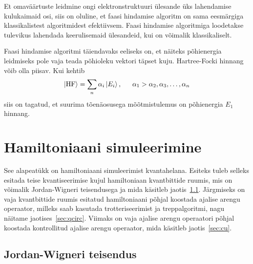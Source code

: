 \documentclass[12pt]{report}
\def\ket#1{\left|#1\right>}
\begin{document}
Et omaväärtuste leidmine ongi elektronstruktuuri ülesande üks lahendamise kulukaimaid osi, siis on oluline, et faasi hindamise algoritm on sama eesmärgiga klassikalistest algoritmidest efektiivsem.
Faasi hindamise algoritmiga loodetakse tulevikus lahendada keerulisemaid ülesandeid, kui on võimalik klassikaliselt.

Faasi hindamise algoritmi täiendavaks eeliseks on, et näiteks põhienergia leidmiseks pole vaja teada põhioleku vektori täpset kuju.
Hartree-Focki hinnang võib olla piisav.
Kui kehtib
\begin{align}
    \ket{\text{HF}} = \sum_n \alpha_i \ket{E_i} \rlap{,}
    \qquad \alpha_1 > \alpha_2, \alpha_3, \ldots, \alpha_n
\end{align}
siis on tagatud, et suurima tõenäosusega mõõtmistulemus on põhienergia \(E_1\) hinnang.

\section{Hamiltoniaani simuleerimine}\label{sec:hamsim}

See alapeatükk on hamiltoniaani simuleerimist kvantahelana.
Esiteks tuleb selleks esitada teise kvantiseerimise kujul hamiltoniaan kvantbittide ruumis, mis on võimalik Jordan-Wigneri teisendusega ja mida käsitleb jaotis~\ref{sec:jw}.
Järgmiseks on vaja kvantbittide ruumis esitatud hamiltoniaani põhjal koostada ajalise arengu operaator, milleks saab kasutada trotteriseerimist ja treppalgoritmi, nagu näitame jaotises~\ref{sec:qcirc}.
Viimaks on vaja ajalise arengu operaatori põhjal koostada kontrollitud ajalise arengu operaator, mida käsitleb jaotis~\ref{sec:cu}.

\subsection{Jordan-Wigneri teisendus}\label{sec:jw}
\end{document}
